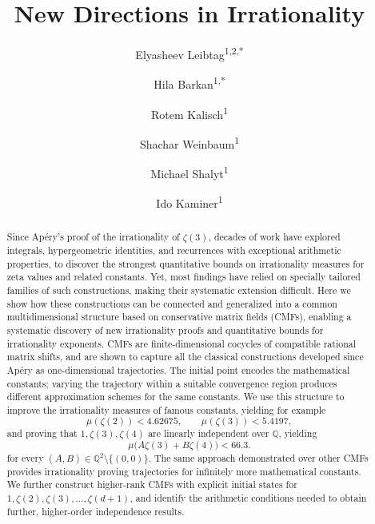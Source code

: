 \documentclass[oneside,english,11pt]{amsart}
\date{}
\title[New Directions in Irrationality]{\LARGE New Directions in Irrationality}
\author[Elyasheev Leibtag]{Elyasheev Leibtag\textsuperscript{1,2,*}}
\author[Hila Barkan]{Hila Barkan\textsuperscript{1,*}}
\author[Rotem Kalisch]{Rotem Kalisch\textsuperscript{1}}
\author[Shachar Weinbaum]{Shachar Weinbaum\textsuperscript{1}}
\author[Michael Shalyt]{Michael Shalyt\textsuperscript{1}}
\author[Ido Kaminer]{Ido Kaminer\textsuperscript{1}}
\begin{document}
\raggedbottom
\begin{abstract}
Since Ap\'ery’s proof of the irrationality of \(\zeta(3)\), decades of work have explored integrals, hypergeometric identities, and recurrences with exceptional arithmetic properties, to discover the strongest quantitative bounds on irrationality measures for zeta values and related constants. 
Yet, most findings have relied on specially tailored families of such constructions, making their systematic extension difficult.
Here we show how these constructions can be connected and generalized into a common multidimensional structure based on conservative matrix fields (CMFs), enabling a systematic discovery of new irrationality proofs and quantitative bounds for irrationality exponents.
CMFs are finite-dimensional cocycles of compatible rational matrix shifts, and are shown to capture all the classical constructions developed since Apéry as one-dimensional trajectories. The initial point encodes the mathematical constants; varying the trajectory within a suitable convergence region produces different approximation schemes for the same constants.
We use this structure to improve the irrationality measures of famous constants, yielding for example
\[
    \mu(\zeta(2))<4.62675,
    \qquad
    \mu(\zeta(3))<5.4197,
\]
and proving that \(1,\zeta(3),\zeta(4)\) are linearly independent over \(\mathbb Q\), yielding
\[
    \mu\bigl(A\zeta(3)+B\zeta(4)\bigr)<66.3.
\]
for every $(A,B)\in\mathbb Q^2\setminus\{(0,0)\}$.
The same approach demonstrated over other CMFs provides irrationality proving trajectories for infinitely more mathematical constants.
We further construct higher-rank CMFs with explicit initial states for \(1,\zeta(2),\zeta(3),\ldots,\zeta(d+1)\), and identify the arithmetic conditions needed to obtain further, higher-order independence results.
\end{abstract}
\end{document}
